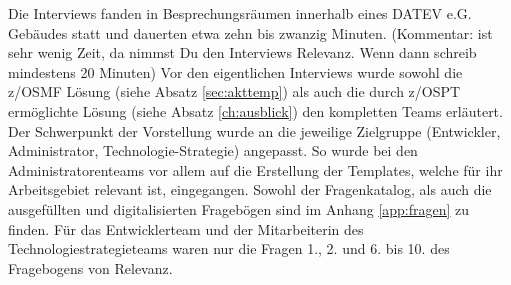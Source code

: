 Die Interviews fanden in  Besprechungsräumen innerhalb eines DATEV e.G. Gebäudes statt und dauerten etwa zehn bis zwanzig Minuten. (Kommentar: ist sehr wenig Zeit, da nimmst Du den Interviews Relevanz. Wenn dann schreib mindestens 20 Minuten)
Vor den eigentlichen Interviews wurde sowohl die z/OSMF Lösung (siehe Absatz \ref{sec:akttemp}) als auch die durch z/OSPT ermöglichte Lösung (siehe Absatz \ref{ch:ausblick}) den kompletten Teams erläutert.
Der Schwerpunkt der Vorstellung wurde an die jeweilige Zielgruppe (Entwickler, Administrator, Technologie-Strategie) angepasst.
So wurde bei den Administratorenteams vor allem auf die Erstellung der Templates, welche für ihr Arbeitsgebiet relevant ist, eingegangen.
Sowohl der Fragenkatalog, als auch die ausgefüllten und digitalisierten Fragebögen sind im Anhang \ref{app:fragen} zu finden.
Für das Entwicklerteam und der Mitarbeiterin des Technologiestrategieteams waren nur die Fragen 1., 2. und 6. bis 10. des Fragebogens von Relevanz.
